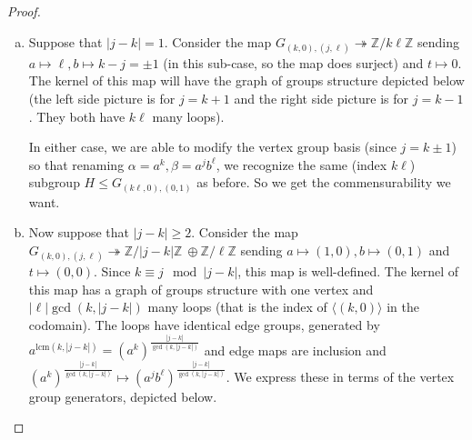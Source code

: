 \documentclass[10pt]{article}
\def\integers{{\mathbb{Z}}}
\def\lcm{\mathrm{lcm}}
\theoremstyle{definition}
\begin{document}
\begin{proof}
\begin{enumerate}[(a)]
Letting $\alpha=a^k, \beta = a^k b^\ell$, we recognize the same  subgroup $H$ of $G_{(k\ell,0),(0,1)}$ as in Case 1. So we get the commensurability we want. 

\item Suppose that $|j-k|=1$. Consider the map $G_{(k,0),(j,\ell)} \twoheadrightarrow \integers/k\ell\integers$ sending $a \mapsto \ell, b \mapsto k-j = \pm 1$ (in this sub-case, so the map does surject) and $t\mapsto 0$. The kernel of this map will have the graph of groups structure depicted below (the left side picture is for $j=k+1$ and the right side picture is for $j=k-1$. They both have $k\ell$ many loops). 

In either case, we are able to modify the vertex group basis (since $j = k\pm 1$) so that renaming $\alpha = a^k, \beta = a^j b^\ell$, we recognize the same (index $k\ell$) subgroup $H \leq G_{(k\ell,0),(0,1)}$ as before. So we get the commensurability we want. 

\item Now suppose that $|j-k|\geq 2$. Consider the map $G_{(k,0),(j,\ell)} \twoheadrightarrow \integers/|j-k|\integers \: \oplus \integers/\ell\integers$ sending $a \mapsto (1,0), b\mapsto (0,1)$ and $t \mapsto (0,0)$. Since $k\equiv j \mod|j-k|$, this map is well-defined. The kernel of this map has a graph of groups structure with one vertex and $|\ell| \gcd(k,|j-k|)$ many loops (that is the index of $\langle (k,0)\rangle$ in the codomain). The loops have identical edge groups, generated by $a^{\lcm(k,|j-k|)} = (a^k)^{\frac{|j-k|}{\gcd(k,|j-k|)}}$ and edge maps are inclusion and $(a^k)^{\frac{|j-k|}{\gcd(k,|j-k|)}} \mapsto (a^j b^\ell)^{\frac{|j-k|}{\gcd(k,|j-k|)}}$. We express these in terms of the vertex group generators, depicted below. 


\end{enumerate}
\end{proof}
\end{document}
